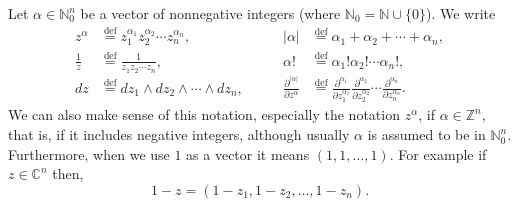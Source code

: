 \documentclass[12pt,openany]{book}
\newcommand{\sabs}[1]{\lvert {#1} \rvert}
\newcommand{\C}{{\mathbb{C}}}
\newcommand{\Z}{{\mathbb{Z}}}
\newcommand{\N}{{\mathbb{N}}}
\theoremstyle{plain}
\theoremstyle{remark}
\theoremstyle{definition}
\theoremstyle{exercise}
\theoremstyle{example}
\begin{document}
Let $\alpha \in \N_0^n$
be a vector of nonnegative integers
%
(where $\N_0 = \N \cup \{ 0\}$).
We write
%
%
%
%
%
\begin{equation*}
\begin{aligned}
z^\alpha & \overset{\text{def}}{=} z_1^{\alpha_1}z_2^{\alpha_2} \cdots
z_n^{\alpha_n} , \\
\frac{1}{z} & \overset{\text{def}}{=} \frac{1}{z_1z_2 \cdots z_n} , \\
dz & \overset{\text{def}}{=} dz_1 \wedge dz_2 \wedge \cdots \wedge dz_n , \\
\end{aligned}
\qquad
\begin{aligned}
\sabs{\alpha} & \overset{\text{def}}{=} \alpha_1 + \alpha_2 + \cdots +
\alpha_n , \\
\alpha! & \overset{\text{def}}{=} \alpha_1!\alpha_2! \cdots \alpha_n! , \\
\frac{\partial^{\sabs{\alpha}}}{\partial z^\alpha} & \overset{\text{def}}{=}
\frac{\partial^{\alpha_1}}{\partial z_1^{\alpha_1}}
\frac{\partial^{\alpha_2}}{\partial z_2^{\alpha_2}}
\cdots
\frac{\partial^{\alpha_n}}{\partial z_n^{\alpha_n}}
.
\end{aligned}
\end{equation*}
We can also make sense of this notation, especially the notation $z^\alpha$,
if $\alpha \in \Z^n$, that is, if it includes negative integers,
although usually $\alpha$ is assumed to be in $\N_0^n$.
Furthermore, when we use $1$ as a vector it means $(1,1,\ldots,1)$.
For example if $z \in \C^n$ then,
\begin{equation*}
1-z = (1-z_1,1-z_2,\ldots,1-z_n) .
\end{equation*}
\end{document}
